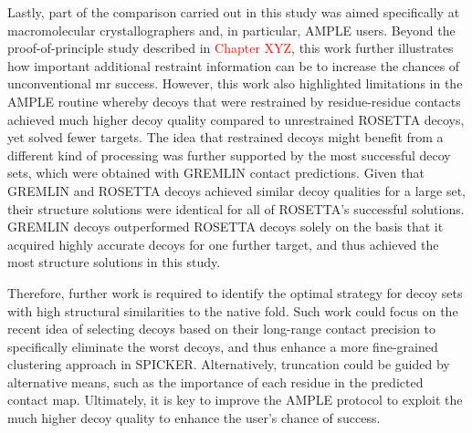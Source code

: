 Lastly, part of the comparison carried out in this study was aimed specifically at macromolecular crystallographers and, in particular, AMPLE users. Beyond the proof-of-principle study described in \textcolor{red}{Chapter XYZ}, this work further illustrates how important additional restraint information can be to increase the chances of unconventional \gls{mr} success. However, this work also highlighted limitations in the AMPLE routine whereby decoys that were restrained by residue-residue contacts achieved much higher decoy quality compared to unrestrained ROSETTA decoys, yet solved fewer targets. The idea that restrained decoys might benefit from a different kind of processing was further supported by the most successful decoy sets, which were obtained with GREMLIN contact predictions. Given that GREMLIN and ROSETTA decoys achieved similar decoy qualities for a large set, their structure solutions were identical for all of ROSETTA’s successful solutions. GREMLIN decoys outperformed ROSETTA decoys solely on the basis that it acquired highly accurate decoys for one further target, and thus achieved the most structure solutions in this study. 

Therefore, further work is required to identify the optimal strategy for decoy sets with high structural similarities to the native fold. Such work could focus on the recent idea of selecting decoys based on their long-range contact precision \cite{De_Oliveira2017-gj, Ovchinnikov2017-nd} to specifically eliminate the worst decoys, and thus enhance a more fine-grained clustering approach in SPICKER. Alternatively, truncation could be guided by alternative means, such as the importance of each residue in the predicted contact map. Ultimately, it is key to improve the AMPLE protocol to exploit the much higher decoy quality to enhance the user’s chance of success.
